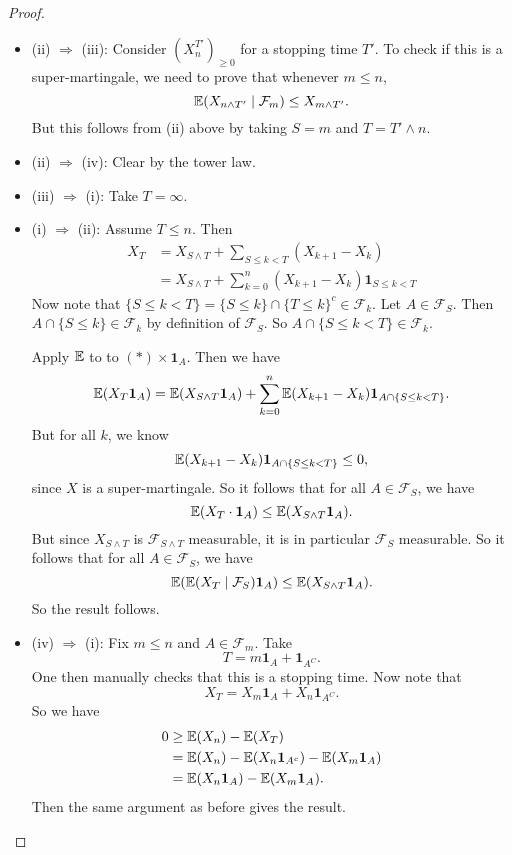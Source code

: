 \documentclass[a4paper]{article}
\begin{document}
\begin{proof}\leavevmode
  \begin{itemize}
    \item (ii) $\Rightarrow$ (iii): Consider $(X_n^{T'})_{ \geq 0}$ for a stopping time $T'$. To check if this is a super-martingale, we need to prove that whenever $m \leq n$,
      \[
        \mathbb{E}(X_{n \wedge T'} \mid \mathcal{F}_m) \leq X_{m \wedge T'}.
      \]
      But this follows from (ii) above by taking $S = m$ and $T = T' \wedge n$.
    \item (ii) $\Rightarrow$ (iv): Clear by the tower law.
    \item (iii) $\Rightarrow$ (i): Take $T = \infty$.
    \item (i) $\Rightarrow$ (ii): Assume $T \leq n$. Then
      \begin{align*}
        X_T &= X_{S \wedge T} + \sum_{S \leq k < T} (X_{k + 1} - X_k)\\
        &= X_{S \wedge T} + \sum_{k = 0}^n (X_{k + 1} - X_k) \mathbf{1}_{S \leq k < T} \tag{$*$}
      \end{align*}
      Now note that $\{S \leq k < T\} = \{S \leq k\} \cap \{T \leq k\}^c \in \mathcal{F}_k$. Let $A \in \mathcal{F}_S$. Then $A \cap \{S \leq k\} \in \mathcal{F}_k$ by definition of $\mathcal{F}_S$. So $A \cap \{S \leq k < T\} \in \mathcal{F}_k$.

      Apply $\mathbb{E}$ to to $(*) \times \mathbf{1}_A$. Then we have
      \[
        \mathbb{E} (X_T \mathbf{1}_A) = \mathbb{E}(X_{S \wedge T} \mathbf{1}_A) + \sum_{k = 0}^n \mathbb{E}(X_{k + 1} - X_k) \mathbf{1}_{A \cap \{S \leq k < T\}}.
      \]
      But for all $k$, we know
      \[
        \mathbb{E}(X_{k + 1} - X_k) \mathbf{1}_{A \cap \{S \leq k < T\}} \leq 0,
      \]
      since $X$ is a super-martingale. So it follows that for all $A \in \mathcal{F}_S$, we have
      \[
        \mathbb{E}(X_T \cdot \mathbf{1}_A) \leq \mathbb{E}(X_{S \wedge T} \mathbf{1}_A).
      \]
      But since $X_{S \wedge T}$ is $\mathcal{F}_{S \wedge T}$ measurable, it is in particular $\mathcal{F}_S$ measurable. So it follows that for all $A \in \mathcal{F}_S$, we have
      \[
        \mathbb{E}(\mathbb{E} (X_T \mid \mathcal{F}_S) \mathbf{1}_A) \leq \mathbb{E}(X_{S \wedge T} \mathbf{1}_A).
      \]
      So the result follows.
    \item (iv) $\Rightarrow$ (i): Fix $m \leq n$ and $A \in \mathcal{F}_m$. Take
      \[
        T = m \mathbf{1}_A + \mathbf{1}_{A^C}.
      \]
      One then manually checks that this is a stopping time. Now note that
      \[
        X_T = X_m \mathbf{1}_{A} + X_n \mathbf{1}_{A^C}.
      \]
      So we have
      \begin{align*}
        0 &\geq \mathbb{E}(X_n) - \mathbb{E}(X_T) \\
        &= \mathbb{E}(X_n) - \mathbb{E}(X_n \mathbf{1}_{A^c}) - \mathbb{E}(X_m \mathbf{1}_A) \\
        &= \mathbb{E} (X_n \mathbf{1}_A) - \mathbb{E} (X_m \mathbf{1}_A).
      \end{align*}
      Then the same argument as before gives the result.\qedhere
  \end{itemize}
\end{proof}
\end{document}
